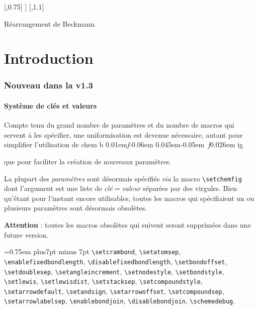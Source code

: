 \documentclass[10pt,french]{article}
\makeatletter
\DeclareRobustCommand\CF{%
	\textsf{%
		chem%
		\if\string b\detokenize\expandafter{\f@series}%
			\lower0.01em\hbox{\itshape f}\kern-0.06em
		\else
			\lower0.045em\hbox{\kern-0.05em \itshape f}\kern0.026em
		\fi ig%
		}%
		\xspace
}
\newcommand*\chevrons[1]{\textlangle\textit{#1}\textrangle}
\makeatother
\begin{document}
\begin{titlepage}
{{{		    
		    \arrow{<->}[,0.75]
		    }}\chemright]
		  \arrow
		\schemestop\hss}\hfill\null
	\begin{center}
		\sffamily\small Réarrangement de Beckmann%
	\end{center}
\end{titlepage}
\parindent0pt\pagestyle{plain}
\tableofcontents
\parskip\medskipamount
\newpage

\part{Introduction}
\section{Nouveau dans la v1.3}
\subsection{Système de clés et valeurs}
Compte tenu du grand nombre de paramètres et du nombre de macros qui servent à les spécifier, une uniformisation est devenue nécessaire, autant pour simplifier l'utilisation de \CF que pour faciliter la création de nouveaux paramètres.

La plupart des \chevrons{paramètres} sont désormais spécifiés \emph{via} la macro \verb|\setchemfig| dont l'argument est une liste de \chevrons{clé}$=$\chevrons{valeur} séparées par des virgules. Bien qu'étant pour l'instant encore utilisables, toutes les macros qui spécifiaient un ou plusieurs paramètres sont désormais obsolètes.
\begin{center}
	\color{red}
	\textbf{Attention} : toutes les macros obsolètes qui suivent seront supprimées dans une future version.
\end{center}
\begingroup
\spaceskip=0.75em plus7pt minus 7pt
\verb-\setcrambond-, \verb-\setatomsep-, \verb-\enablefixedbondlength-, \verb-\disablefixedbondlength-, \verb-\setbondoffset-, \verb-\setdoublesep-, \verb-\setangleincrement-, \verb-\setnodestyle-, \verb-\setbondstyle-, \verb-\setlewis-, \verb-\setlewisdist-, \verb-\setstacksep-, \verb-\setcompoundstyle-, \verb-\setarrowdefault-, \verb-\setandsign-, \verb-\setarrowoffset-, \verb-\setcompoundsep-, \verb-\setarrowlabelsep-, \verb-\enablebondjoin-, \verb-\disablebondjoin-, \verb-\schemedebug-.%
\endgroup
\end{document}
